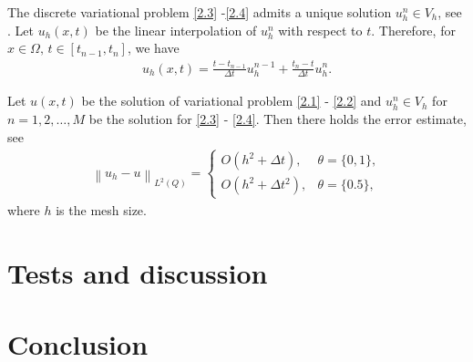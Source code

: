 \documentclass[twocolumn]{article}
\begin{document}
The discrete variational problem \eqref{2.3} -\eqref{2.4} admits a unique solution $u^n_h\in V_h$, see \cite{}. Let $u_h(x, t)$ be the linear interpolation of $u_h^n$ with respect to $t$. Therefore, for $x\in \Omega,\, t\in [t_{n-1}, t_n]$, we have
\begin{align*}
	u_h(x, t)=\frac{t-t_{n-1}}{\Delta t}u_h^{n-1}+\frac{t_n-t}{\Delta t}u_h^{n}.
\end{align*}
\begin{dl}\label{dl2.1}
	Let $u(x, t)$ be the solution of variational problem \eqref{2.1} - \eqref{2.2} and $u^n_h\in V_h$ for $n=1, 2, \dots, M$ be the solution for \eqref{2.3} - \eqref{2.4}. Then there holds the error estimate, see \cite{}
	\begin{align}\label{2.5}
		\left\|u_h-u\right\|_{L^2(Q)}=
		\begin{cases}
			O\left(h^2+\Delta t\right), &\theta=\{0, 1\},\\
			O\left(h^2+\Delta t^2\right), &\theta=\{0.5\},
		\end{cases}		
	\end{align}
	where $h$ is the mesh size.
\end{dl}



\section{Tests and discussion}




\section{Conclusion}



{}
\vfill
\end{document}
